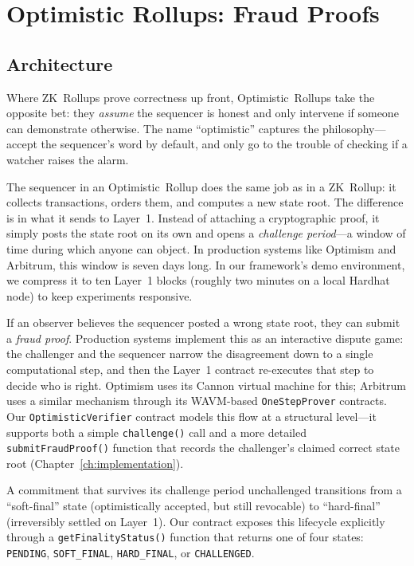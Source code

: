 \documentclass[
]{elteikthesis}[2024/04/26]
\begin{document}
\section{Optimistic Rollups: Fraud Proofs}

\subsection{Architecture}

Where ZK~Rollups prove correctness up front, Optimistic~Rollups take the opposite bet: they \textit{assume} the sequencer is honest and only intervene if someone can demonstrate otherwise. The name ``optimistic'' captures the philosophy---accept the sequencer's word by default, and only go to the trouble of checking if a watcher raises the alarm.

The sequencer in an Optimistic~Rollup does the same job as in a ZK~Rollup: it collects transactions, orders them, and computes a new state root. The difference is in what it sends to Layer~1. Instead of attaching a cryptographic proof, it simply posts the state root on its own and opens a \textit{challenge period}---a window of time during which anyone can object. In production systems like Optimism and Arbitrum, this window is seven days long. In our framework's demo environment, we compress it to ten Layer~1 blocks (roughly two minutes on a local Hardhat node) to keep experiments responsive.

If an observer believes the sequencer posted a wrong state root, they can submit a \textit{fraud proof}. Production systems implement this as an interactive dispute game: the challenger and the sequencer narrow the disagreement down to a single computational step, and then the Layer~1 contract re-executes that step to decide who is right. Optimism uses its Cannon virtual machine for this; Arbitrum uses a similar mechanism through its WAVM-based \texttt{OneStepProver} contracts. Our \texttt{OptimisticVerifier} contract models this flow at a structural level---it supports both a simple \texttt{challenge()} call and a more detailed \texttt{submitFraudProof()} function that records the challenger's claimed correct state root (Chapter~\ref{ch:implementation}).

A commitment that survives its challenge period unchallenged transitions from a ``soft-final'' state (optimistically accepted, but still revocable) to ``hard-final'' (irreversibly settled on Layer~1). Our contract exposes this lifecycle explicitly through a \texttt{getFinalityStatus()} function that returns one of four states: \texttt{PENDING}, \texttt{SOFT\_FINAL}, \texttt{HARD\_FINAL}, or \texttt{CHALLENGED}.
\end{document}
